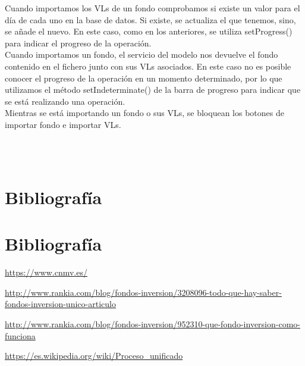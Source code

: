 \documentclass[12pt, a4paper]{article}
\newcommand*\parttitle{}
\let\origpart\part
\renewcommand*{\part}[2][]{%
	\ifx\\#1\\%
	\origpart{#2}%
	\renewcommand*\parttitle{#2}%
	\else
	\origpart[#1]{#2}%
	\renewcommand*\parttitle{#1}%
	\fi
}
\begin{document}
\newpage

Cuando importamos los \gls{VL}s de un fondo comprobamos si existe un valor para el día de cada uno en la base de datos. Si existe, se actualiza el que tenemos, sino, se añade el nuevo. En este caso, como en los anteriores, se utiliza setProgress() para indicar el progreso de la operación.\\

Cuando importamos un fondo, el servicio del modelo nos devuelve el fondo contenido en el fichero junto con sus \gls{VL}s asociados. En este caso no es posible conocer el progreso de la operación en un momento determinado, por lo que utilizamos el método setIndeterminate() de la barra de progreso para indicar que se está realizando una operación.\\

Mientras se está importando un fondo o sus \gls{VL}s, se bloquean los botones de importar fondo e importar \gls{VL}s.
\newpage


\newpage
\part{Bibliografía}

\begin{thebibliography}{10}
	
	\bibitem[CNMV]{}
	\newline
	\href{https://www.cnmv.es/}{https://www.cnmv.es/}
	
	\bibitem[Rankia]{}
	\newline
	\href{http://www.rankia.com/blog/fondos-inversion/3208096-todo-que-hay-saber-fondos-inversion-unico-articulo}{http://www.rankia.com/blog/fondos-inversion/3208096-todo-que-hay-saber-fondos-inversion-unico-articulo}
	
	\bibitem[Rankia]{}
	\newline
	\href{http://www.rankia.com/blog/fondos-inversion/952310-que-fondo-inversion-como-funciona}{http://www.rankia.com/blog/fondos-inversion/952310-que-fondo-inversion-como-funciona}
	
	\bibitem[Wikipedia]{}
	\newline
	\href{https://es.wikipedia.org/wiki/Proceso\_unificado}{https://es.wikipedia.org/wiki/Proceso\_unificado}
	
\end{thebibliography}
\newpage
{}
\printglossary[type=\acronymtype]
\end{document}
